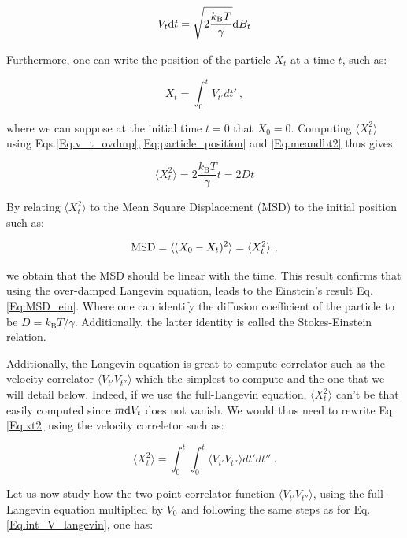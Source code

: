 \begin{equation}
	V_t\textnormal{d}t  = \sqrt{2\frac{k_\mathrm{B}T}{\gamma}} \textnormal{d}B_t 
	\label{Eq.v_t_ovdmp}
\end{equation}

Furthermore, one can write the position of the particle $X_t$ at a time $t$, such as:

\begin{equation}
	X_t = \int _0 ^t V_{t'}dt'~,
	\label{Eq:particle_position}
\end{equation}

where we can suppose at the initial time $t=0$ that $X_0 = 0$. Computing 
$\langle X_t^2 \rangle$ using Eqs.\ref{Eq.v_t_ovdmp},\ref{Eq:particle_position} and \ref{Eq.meandbt2} thus gives:

\begin{equation}
	\langle X_t ^2 \rangle =  2\frac{k_\mathrm{B}T}{\gamma}t = 2Dt
	\label{Eq.xt2}
\end{equation}

By relating $\langle X_t ^2 \rangle$ to the Mean Square Displacement (\gls{MSD}) to the initial position such as:

\begin{equation}
	\textnormal{MSD} = \langle (X_0 - X_ t)^2 \rangle =  \langle X_t ^2 \rangle~,
\end{equation}


we obtain that the \gls{MSD} should be linear with the time. This result confirms that using the over-damped Langevin equation, leads to the Einstein's result Eq.\ref{Eq:MSD_ein}. Where one can identify the diffusion coefficient of the particle to be $D = k_\mathrm{B}T / \gamma$. Additionally, the latter identity is called the Stokes-Einstein  relation.


Additionally, the Langevin equation is great to compute correlator such as the velocity correlator $ \langle V_{t'}V_{t''} \rangle$ which the simplest to compute and the one that we will detail below. Indeed, if we use the full-Langevin equation, $\langle X_t ^2 \rangle$ can't be that easily computed since $m\textnormal{d} V_t$ does not vanish. We would thus need to rewrite Eq.\ref{Eq.xt2}  using the velocity correletor such as:

\begin{equation}
	\langle X_t ^ 2 \rangle  = \int _0 ^ {t} \int _0 ^{t} \langle V_{t'}V_{t''} \rangle dt'dt'' ~.
	\label{Eq.int_msd}
\end{equation}

Let us now study how the two-point correlator function $ \langle V_{t'}V_{t''} \rangle $, using the full-Langevin equation multiplied by $V_0$ and following the same steps as for Eq.\ref{Eq.int_V_langevin}, one  has:

